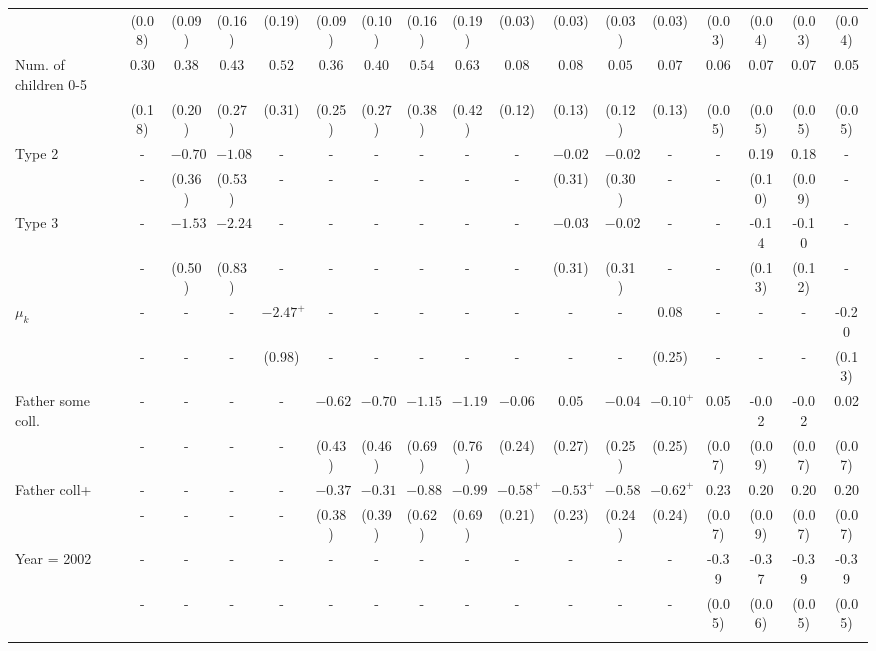 \begin{tabular}{lcccccccccccccccc}
&(0.08)&(0.09)&(0.16)&(0.19)&(0.09)&(0.10)&(0.16)&(0.19)&(0.03)&(0.03)&(0.03)&(0.03)&(0.03)&(0.04)&(0.03)&(0.04)\\
Num. of children 0-5&$0.30$&$0.38$&$0.43$&$0.52$&$0.36$&$0.40$&$0.54$&$0.63$&$0.08$&$0.08$&$0.05$&$0.07$&0.06&0.07&0.07&0.05\\
&(0.18)&(0.20)&(0.27)&(0.31)&(0.25)&(0.27)&(0.38)&(0.42)&(0.12)&(0.13)&(0.12)&(0.13)&(0.05)&(0.05)&(0.05)&(0.05)\\
Type 2&-&$-0.70$&$-1.08$&-&-&-&-&-&-&$-0.02$&$-0.02$&-&-&0.19&0.18&-\\
&-&(0.36)&(0.53)&-&-&-&-&-&-&(0.31)&(0.30)&-&-&(0.10)&(0.09)&-\\
Type 3&-&$-1.53$&$-2.24$&-&-&-&-&-&-&$-0.03$&$-0.02$&-&-&-0.14&-0.10&-\\
&-&(0.50)&(0.83)&-&-&-&-&-&-&(0.31)&(0.31)&-&-&(0.13)&(0.12)&-\\
$\mu_{k}$&-&-&-&$-2.47^{+}$&-&-&-&-&-&-&-&$0.08$&-&-&-&-0.20\\
&-&-&-&(0.98)&-&-&-&-&-&-&-&(0.25)&-&-&-&(0.13)\\
Father some coll.&-&-&-&-&$-0.62$&$-0.70$&$-1.15$&$-1.19$&$-0.06$&$0.05$&$-0.04$&$-0.10^{+}$&0.05&-0.02&-0.02&0.02\\
&-&-&-&-&(0.43)&(0.46)&(0.69)&(0.76)&(0.24)&(0.27)&(0.25)&(0.25)&(0.07)&(0.09)&(0.07)&(0.07)\\
Father coll+&-&-&-&-&$-0.37$&$-0.31$&$-0.88$&$-0.99$&$-0.58^{+}$&$-0.53^{+}$&$-0.58$&$-0.62^{+}$&0.23&0.20&0.20&0.20\\
&-&-&-&-&(0.38)&(0.39)&(0.62)&(0.69)&(0.21)&(0.23)&(0.24)&(0.24)&(0.07)&(0.09)&(0.07)&(0.07)\\
Year = 2002&-&-&-&-&-&-&-&-&-&-&-&-&-0.39&-0.37&-0.39&-0.39\\
&-&-&-&-&-&-&-&-&-&-&-&-&(0.05)&(0.06)&(0.05)&(0.05)\\
\\
\bottomrule\end{tabular}